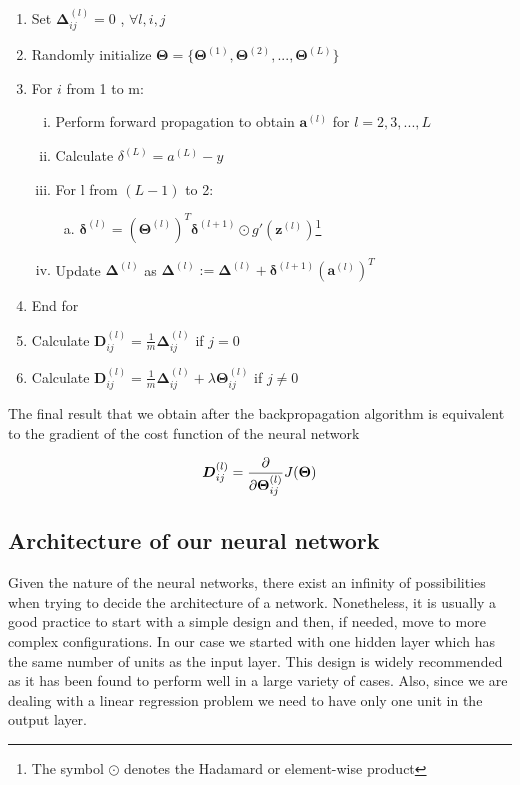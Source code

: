 \documentclass[a4paper, report, oneside, UKenglish]{memoir}
\newcommand{\ba}{\boldsymbol{a}}
\newcommand{\bD}{\boldsymbol{D}}
\newcommand{\bz}{\boldsymbol{z}}
\newcommand{\bdelta}{\boldsymbol{\delta}}
\newcommand{\bDelta}{\boldsymbol{\Delta}}
\newcommand{\bTheta}{\boldsymbol{\Theta}}
\begin{document}
\begin{enumerate}
    \item Set $\bDelta_{ij}^{(l)} = 0$ , $\forall l, i, j$
    \item Randomly initialize $\bTheta = \{\bTheta^{(1)}, \bTheta^{(2)}, ..., \bTheta^{(L)}\}$
    \item For $i$ from 1 to m:
    \begin{enumerate}[i.]
        \item Perform forward propagation to obtain $\ba ^{(l)}$ for $l=2, 3, ..., L$
        \item Calculate $\delta^{(L)} = a^{(L)} - y$
        \item For l from $(L-1)$ to 2:
        \begin{enumerate}[a.]
            \item $\bdelta^{(l)} = (\bTheta^{(l)})^T\bdelta^{(l+1)} \odot g'(\bz^{(l)})$\footnote{The symbol $\odot$ denotes the Hadamard or element-wise product}
        \end{enumerate}
        \item Update $\bDelta^{(l)}$ as $\bDelta^{(l)} := \bDelta^{(l)} + \bdelta^{(l+1)}(\ba^{(l)})^T$
    \end{enumerate}
    \item End for
    \item Calculate $\bD_{ij}^{(l)} = \frac{1}{m} \bDelta_{ij}^{(l)}$ if $j = 0$
    \item Calculate $\bD_{ij}^{(l)} = \frac{1}{m} \bDelta_{ij}^{(l)} + \lambda \bTheta_{ij}^{(l)}$ if $j \neq 0$
\end{enumerate}

The final result that we obtain after the backpropagation algorithm is equivalent to the gradient of the cost function of the neural network

\begin{equation}
    \bD_{ij}^{(l)} = \pdv{}{\bTheta_{ij}^{(l)}} J(\bTheta)
\end{equation}


\subsection{Architecture of our neural network}
Given the nature of the neural networks, there exist an infinity of possibilities when trying to decide the architecture of a network. Nonetheless, it is usually a good practice to start with a simple design and then, if needed, move to more complex configurations. In our case we started with one hidden layer which has the same number of units as the input layer. This design is widely recommended as it has been found to perform well in a large variety of cases. Also, since we are dealing with a linear regression problem we need to have only one unit in the output layer.
\end{document}
